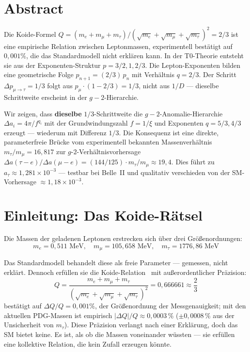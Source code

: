 \section*{Abstract}
	Die Koide-Formel $Q = (m_e + m_\mu + m_\tau)/(\sqrt{m_e} + \sqrt{m_\mu} + \sqrt{m_\tau})^2 = 2/3$ ist eine empirische Relation zwischen Leptonmassen, experimentell bestätigt auf $0{,}001\%$, die das Standardmodell nicht erklären kann. In der T0-Theorie entsteht sie aus der Exponenten-Struktur $p = 3/2, 1, 2/3$. Die Lepton-Exponenten bilden eine geometrische Folge $p_{n+1} = (2/3)\,p_n$ mit Verhältnis $q = 2/3$. Der Schritt $\Delta p_{\mu\to\tau} = 1/3$ folgt aus $p_\mu \cdot (1 - 2/3) = 1/3$, nicht aus $1/D$ — dieselbe Schrittweite erscheint in der $g-2$-Hierarchie.
	
	Wir zeigen, dass \textbf{dieselbe} $1/3$-Schrittweite die $g-2$-Anomalie-Hierarchie $\Delta a_i = 4\pi/f^{q_i}$ mit der Grundwindungszahl $f = 1/\xi$ und Exponenten $q = 5/3, 4/3$ erzeugt — wiederum mit Differenz $1/3$. Die Konsequenz ist eine direkte, parameterfreie Brücke vom experimentell bekannten Massenverhältnis $m_\tau/m_\mu = 16{,}817$ zur $g$-$2$-Verhältnisvorhersage $\Delta a(\tau{-}e)/\Delta a(\mu{-}e) = (144/125) \cdot m_\tau/m_\mu \approx 19{,}4$. Dies führt zu $a_\tau \approx 1{,}281 \times 10^{-3}$ — testbar bei Belle~II und qualitativ verschieden von der SM-Vorhersage $\approx 1{,}18 \times 10^{-3}$.

\section{Einleitung: Das Koide-Rätsel}

Die Massen der geladenen Leptonen erstrecken sich über drei Größenordnungen:
\begin{equation}
	m_e = 0{,}511 \text{ MeV}, \quad m_\mu = 105{,}658 \text{ MeV}, \quad m_\tau = 1776{,}86 \text{ MeV}
\end{equation}

Das Standardmodell behandelt diese als freie Parameter — gemessen, nicht erklärt. Dennoch erfüllen sie die Koide-Relation~\cite{Koide1983} mit außerordentlicher Präzision:
\begin{equation}
	\boxed{Q = \frac{m_e + m_\mu + m_\tau}{\left(\sqrt{m_e} + \sqrt{m_\mu} + \sqrt{m_\tau}\right)^2} = 0{,}666661 \approx \frac{2}{3}}
	\label{eq:koide}
\end{equation}
bestätigt auf $\Delta Q/Q = 0{,}001\%$, der Größenordnung der Messgenauigkeit; mit den aktuellen PDG-Massen ist empirisch $|\Delta Q|/Q \approx 0{,}0003\,\%$ ($\pm0{,}0008\,\%$ aus der Unsicherheit von $m_\tau$). Diese Präzision verlangt nach einer Erklärung, doch das SM bietet keine. Es ist, als ob die Massen voneinander wüssten — sie erfüllen eine kollektive Relation, die kein Zufall erzeugen könnte.

